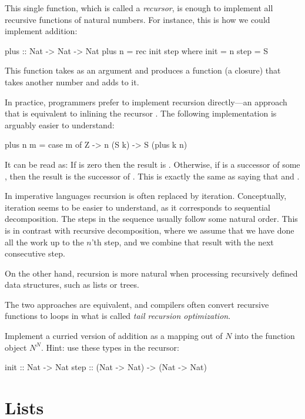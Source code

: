 \documentclass[DaoFP]{subfiles}
\begin{document}
This single function, which is called a \emph{recursor}, is enough to implement all recursive functions of natural numbers. For instance, this is how we could implement addition:

\begin{haskell}
plus :: Nat -> Nat -> Nat
plus n = rec init step
  where
    init = n
    step = S
\end{haskell}
This function takes  as an argument and produces a function (a closure) that takes another number and adds   to it. 

In practice, programmers prefer to implement recursion directly---an approach that is equivalent to inlining the recursor . The following implementation is arguably easier to understand:
\begin{haskell}
plus n m = case m of
  Z -> n
  (S k) -> S (plus k n)
\end{haskell}
It can be read as: If  is zero then the result is . Otherwise, if  is a successor of some , then the result is the successor of  . This is exactly the same as saying that  and .

In imperative languages recursion is often replaced by iteration. Conceptually, iteration seems to be easier to understand, as it corresponds to sequential decomposition. The steps in the sequence usually follow some natural order. This is in contrast with recursive decomposition, where we assume that we have done all the work up to the $n$'th step, and we combine that result with the next consecutive step. 

On the other hand, recursion is more natural when processing recursively defined data structures, such as lists or trees. 

The two approaches are equivalent, and compilers often convert recursive functions to loops in what is called \emph{tail recursion optimization}.

\begin{exercise}
Implement a curried version of addition as a mapping out of $N$ into the function object $N^N$. Hint: use these types in the recursor:
\begin{haskell}
init :: Nat -> Nat
step :: (Nat -> Nat) -> (Nat -> Nat)
\end{haskell}

\end{exercise}

\section{Lists}
\end{document}
